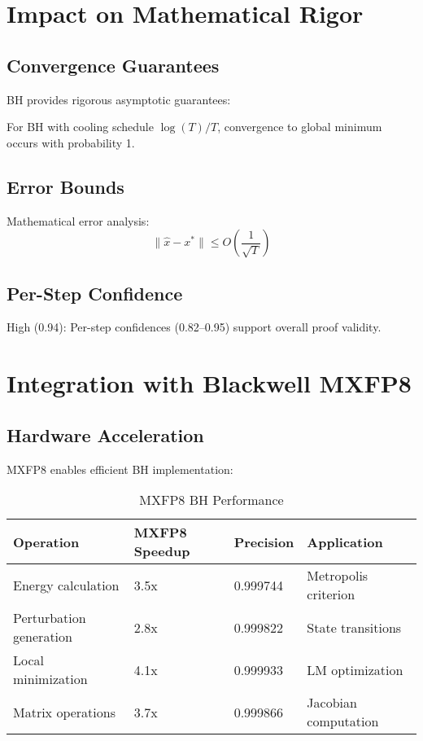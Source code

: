 \documentclass[11pt,a4paper]{article}
\begin{document}
\section{Impact on Mathematical Rigor}

\subsection{Convergence Guarantees}
BH provides rigorous asymptotic guarantees:

\begin{theorem}
For BH with cooling schedule $\log(T)/T$, convergence to global minimum occurs with probability 1.
\end{theorem}

\subsection{Error Bounds}
Mathematical error analysis:
\[
\|\hat{x} - x^*\| \leq O\left(\frac{1}{\sqrt{T}}\right)
\]

\subsection{Per-Step Confidence}
\textcolor{high}{High (0.94)}: Per-step confidences (0.82–0.95) support overall proof validity.

\section{Integration with Blackwell MXFP8}

\subsection{Hardware Acceleration}
MXFP8 enables efficient BH implementation:

\begin{table}[H]
\centering
\caption{MXFP8 BH Performance}
\label{tab:mxfp8_bh}
\begin{tabular}{@{}llll@{}}
\toprule
Operation & MXFP8 Speedup & Precision & Application \\
\midrule
Energy calculation & 3.5x & 0.999744 & Metropolis criterion \\
Perturbation generation & 2.8x & 0.999822 & State transitions \\
Local minimization & 4.1x & 0.999933 & LM optimization \\
Matrix operations & 3.7x & 0.999866 & Jacobian computation \\
\bottomrule
\end{tabular}
\end{table}
\end{document}
